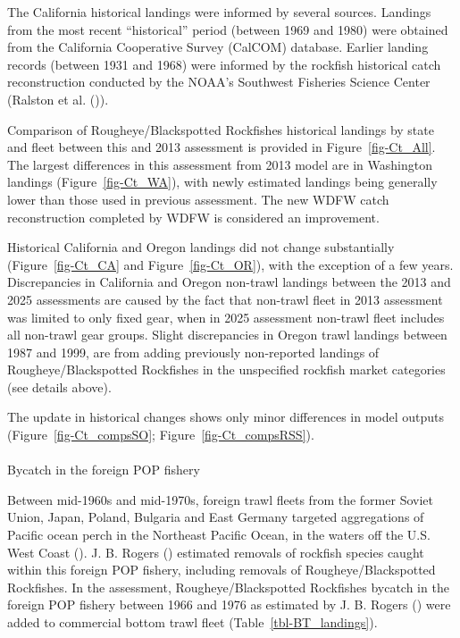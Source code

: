 \documentclass[
]{scrartcl}
\makeatletter
\let\oldparagraph\paragraph
\renewcommand{\paragraph}{
    \@ifstar
      \xxxParagraphStar
      \xxxParagraphNoStar
  }
\newcommand{\xxxParagraphStar}[1]{\oldparagraph*{#1}\mbox{}}
\newcommand{\xxxParagraphNoStar}[1]{\oldparagraph{#1}\mbox{}}
\makeatother
\begin{document}
The California historical landings were informed by several sources.
Landings from the most recent ``historical'' period (between 1969 and
1980) were obtained from the California Cooperative Survey (CalCOM)
database. Earlier landing records (between 1931 and 1968) were informed
by the rockfish historical catch reconstruction conducted by the NOAA's
Southwest Fisheries Science Center (Ralston et al.
()).

Comparison of Rougheye/Blackspotted Rockfishes historical landings by
state and fleet between this and 2013 assessment is provided in
Figure~\ref{fig-Ct_All}. The largest differences in this assessment from
2013 model are in Washington landings (Figure~\ref{fig-Ct_WA}), with
newly estimated landings being generally lower than those used in
previous assessment. The new WDFW catch reconstruction completed by WDFW
is considered an improvement.

Historical California and Oregon landings did not change substantially
(Figure~\ref{fig-Ct_CA} and Figure~\ref{fig-Ct_OR}), with the exception
of a few years. Discrepancies in California and Oregon non-trawl
landings between the 2013 and 2025 assessments are caused by the fact
that non-trawl fleet in 2013 assessment was limited to only fixed gear,
when in 2025 assessment non-trawl fleet includes all non-trawl gear
groups. Slight discrepancies in Oregon trawl landings between 1987 and
1999, are from adding previously non-reported landings of
Rougheye/Blackspotted Rockfishes in the unspecified rockfish market
categories (see details above).

The update in historical changes shows only minor differences in model
outputs (Figure~\ref{fig-Ct_compsSO}; Figure~\ref{fig-Ct_compsRSS}).

\paragraph{Bycatch in the foreign POP
fishery}\label{bycatch-in-the-foreign-pop-fishery}

Between mid-1960s and mid-1970s, foreign trawl fleets from the former
Soviet Union, Japan, Poland, Bulgaria and East Germany targeted
aggregations of Pacific ocean perch in the Northeast Pacific Ocean, in
the waters off the U.S. West Coast
(). J. B. Rogers ()
estimated removals of rockfish species caught within this foreign POP
fishery, including removals of Rougheye/Blackspotted Rockfishes. In the
assessment, Rougheye/Blackspotted Rockfishes bycatch in the foreign POP
fishery between 1966 and 1976 as estimated by J. B. Rogers
() were added to commercial
bottom trawl fleet (Table~\ref{tbl-BT_landings}).
\end{document}
